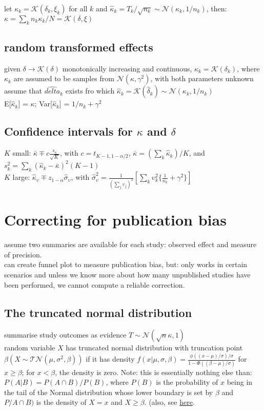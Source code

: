 let $\kappa_k = \mathcal{K}(\delta_k,\xi_k)$ for all $k$ and $\hat{\kappa}_k = T_k / \sqrt{n_k} \sim \mathcal{N}(\kappa_k, 1/n_k)$, then: $\kappa = \sum\limits_k n_k \kappa_k / N = \mathcal{K}(\delta, \xi)$

\subsection{random transformed effects}
given $\delta \rightarrow \mathcal{K}(\delta)$ monotonically increasing and continuous, $\kappa_k = \mathcal{K}(\delta_k)$, where $\kappa_k$ are assumed to be samples from $\mathcal{N}(\kappa, \gamma^2)$, with both parameters unknown\\
assume that $\hat{delta}_k$ exists fro which $\hat{\kappa}_k = \mathcal{K}(\hat{\delta}_k) \sim \mathcal{N}(\kappa_k,1/n_k)$\\
E[$\hat{\kappa}_k$] = $\kappa$; Var[$\hat{\kappa}_k$] = $1/n_k + \gamma^2$\\

\subsection{Confidence intervals for $\kappa$ and $\delta$}
$K$ small: $\bar{\kappa}\mp c \frac{s_\kappa}{\sqrt{K}}$, with $c=t_{K-1,1-\alpha/2}$, $\bar{\kappa}=(\sum_k\hat{\kappa}_k)/K$, and $s_k^2 = \sum_k (\hat{\kappa}_k-\bar{\kappa})^2(K-1)$\\
$K$ large: $\hat{\kappa}_\upsilon \mp z_{1-\alpha}\hat{\sigma}_\upsilon$, with $\hat{\sigma}_{\upsilon}^2 = \frac{1}{(\sum_j \upsilon_j)^2}[\sum\limits_k \upsilon_k^2 \{\frac{1}{n_k}+\gamma^2\}]$

\section{Correcting for publication bias}
assume two summaries are available for each study: observed effect and measure of precision.\\
can create funnel plot to measure publication bias, but: only works in certain scenarios and unless we know more about how many unpublished studies have been performed, we cannot compute a reliable correction.\\

\subsection{The truncated normal distribution}
summarise study outcomes as evidence $T \sim \mathcal{N}(\sqrt{n}\kappa,1)$\\
random variable $X$ has truncated normal distribution with truncation point $\beta(X\sim \mathcal{TN}(\mu,\sigma^2,\beta))$ if it has density $f(x| \mu, \sigma, \beta) = \frac{\phi((x-\mu)/\sigma)/\sigma}{1-\Phi((\beta-\mu)/\sigma)}$ for $x \geq \beta$; for $x < \beta$, the density is zero. Note: this is essentially nothing else than: $P(A|B) = P(A\cap B) / P(B)$, where $P(B)$ is the probability of $x$ being in the tail of the Normal distribution whose lower boundary is set by $\beta$ and $P/A\cap B)$ is the density of $X=x$ and $X\geq \beta$. (also, see \href{http://dongguo.me/me/blog/2013/12/02/gaussian-and-truncated-gaussian/}{here}.


